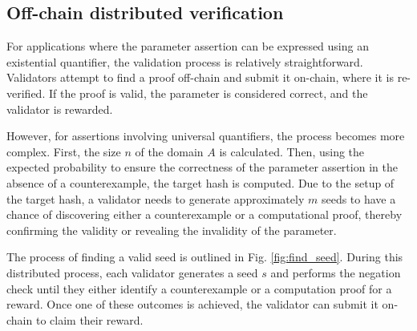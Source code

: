 \documentclass[runningheads]{llncs}
\begin{document}
\subsection{Off-chain distributed verification}
For applications where the parameter assertion can be expressed using an existential quantifier, the validation process is relatively straightforward. Validators attempt to find a proof off-chain and submit it on-chain, where it is re-verified. If the proof is valid, the parameter is considered correct, and the validator is rewarded.

However, for assertions involving universal quantifiers, the process becomes more complex. First, the size \( n \) of the domain \( A \) is calculated. Then, using the expected probability to ensure the correctness of the parameter assertion in the absence of a counterexample, the target hash is computed. Due to the setup of the target hash, a validator needs to generate approximately \( m \) seeds to have a chance of discovering either a counterexample or a computational proof, thereby confirming the validity or revealing the invalidity of the parameter.

The process of finding a valid seed is outlined in Fig. \ref{fig:find_seed}. During this distributed process, each validator generates a seed \( s \) and performs the negation check until they either identify a counterexample or a computation proof for a reward. Once one of these outcomes is achieved, the validator can submit it on-chain to claim their reward.
\end{document}
